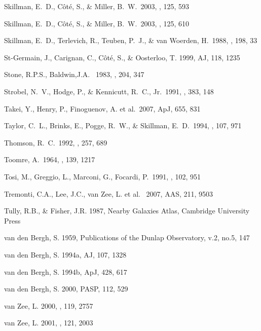 \documentclass[12pt,preprint]{emulateapj}
\begin{document}
\begin{thebibliography}{}
Skillman, E.~D., C{\^o}t{\'e}, S., \& Miller, B.~W.\ 2003, \aj, 125, 593

Skillman, E.~D., C{\^o}t{\'e}, S., \& Miller, B.~W.\ 2003, \aj, 125, 610 

Skillman, E.~D., Terlevich, R., Teuben, P.~J., \& van Woerden, H.\ 1988, \aap, 198, 33 

St-Germain, J., Carignan, C., C\^ot\'e, S., \& Oosterloo, T. 1999, AJ, 118, 1235

Stone, R.P.S., Baldwin,J.A. \ 1983, \mnras, 204, 347

Strobel, N.~V., Hodge, P., \& Kennicutt, R.~C., Jr.\ 1991, \apj, 383, 148 

Takei, Y., Henry, P., Finoguenov, A. et al.\ 2007, ApJ, 655, 831 

Taylor, C.~L., Brinks, E., Pogge, R.~W., \& Skillman, E.~D.\ 1994, \aj, 107, 971 

Thomson, R.~C.\ 1992, \mnras, 257, 689 

Toomre, A.\ 1964, \apj, 139, 1217 

Tosi, M., Greggio, L., Marconi, G., Focardi, P.\ 1991, \aj, 102, 951 

Tremonti, C.A., Lee, J.C., van Zee, L. et al. \ 2007, AAS, 211, 9503

Tully, R.B., \& Fisher, J.R. 1987, Nearby Galaxies Atlas, Cambridge
University Press
 
van den Bergh, S. 1959, Publications of the Dunlap Observatory, v.2, no.5, 147

van den Bergh, S. 1994a, AJ, 107, 1328

van den Bergh, S. 1994b, ApJ, 428, 617

van den Bergh, S. 2000, PASP, 112, 529

van Zee, L. 2000, \aj , 119, 2757

van Zee, L. 2001, \aj , 121, 2003


\end{thebibliography}
\end{document}
